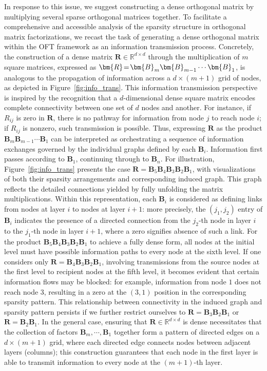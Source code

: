 In response to this issue, we suggest constructing a dense orthogonal matrix by multiplying several sparse orthogonal matrices together. To facilitate a comprehensive and accessible analysis of the sparsity structure in orthogonal matrix factorizations, we recast the task of generating a dense orthogonal matrix within the OFT framework as an information transmission process. Concretely, the construction of a dense matrix $\bm{R}\in\mathbb{R}^{d\times d}$ through the multiplication of $m$ square matrices, expressed as $\thickmuskip=2mu \medmuskip=2mu \bm{R}=\bm{B}_m\bm{B}_{m-1}\cdots\bm{B}_1$, is analogous to the propagation of information across a $d\times (m+1)$ grid of nodes, as depicted in Figure~\ref{fig:info_trans}. This information transmission perspective is inspired by the recognition that a $d$-dimensional dense square matrix encodes complete connectivity between one set of $d$ nodes and another. For instance, if $R_{ij}$ is zero in $\bm{R}$, there is no pathway for information from node $j$ to reach node $i$; if $R_{ij}$ is nonzero, such transmission is possible. Thus, expressing $\bm{R}$ as the product $\bm{B}_m\bm{B}_{m-1}\cdots\bm{B}_1$ can be interpreted as orchestrating a sequence of information exchanges governed by the individual graphs defined by each $\bm{B}_i$. Information first passes according to $\bm{B}_1$, continuing through to $\bm{B}_n$. For illustration, Figure~\ref{fig:info_trans} presents the case $\bm{R}=\bm{B}_5\bm{B}_4\bm{B}_3\bm{B}_2\bm{B}_1$, with visualizations of both their sparsity arrangements and corresponding induced graph. This graph reflects the detailed connections yielded by fully unfolding the matrix multiplications. Within this representation, each $\bm{B}_i$ is considered as defining links from nodes at layer $i$ to nodes at layer $i+1$: more precisely, the $(j_1,j_2)$ entry of $\bm{B}_i$ indicates the presence of a directed connection from the $j_2$-th node in layer $i$ to the $j_1$-th node in layer $i+1$, where a zero signifies absence of such a link. For the product $\bm{B}_5\bm{B}_4\bm{B}_3\bm{B}_2\bm{B}_1$ to achieve a fully dense form, all nodes at the initial level must have possible information paths to every node at the sixth level. If one considers only $\bm{R}=\bm{B}_4\bm{B}_3\bm{B}_2\bm{B}_1$, involving transmissions from the source nodes at the first level to recipient nodes at the fifth level, it becomes evident that certain information flows may be blocked: for example, information from node $1$ does not reach node $3$, resulting in a zero at the $(3,1)$ position in the corresponding sparsity pattern. This relationship between connectivity in the induced graph and sparsity pattern persists if we further restrict ourselves to $\bm{R}=\bm{B}_3\bm{B}_2\bm{B}_1$ or $\bm{R}=\bm{B}_2\bm{B}_1$. In the general case, ensuring that $\bm{R}\in\mathbb{R}^{d\times d}$ is dense necessitates that the collection of factors $\bm{B}_m,\cdots,\bm{B}_1$ together form a pattern of directed edges on a $d\times (m+1)$ grid, where each directed edge connects nodes between adjacent layers (columns); this construction guarantees that each node in the first layer is able to transmit information to every node at the $(m+1)$-th layer.


